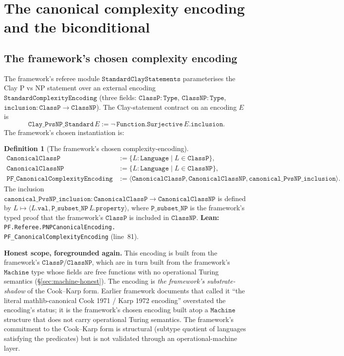 \documentclass[11pt,a4paper]{article}
\theoremstyle{plain}
\theoremstyle{definition}
\newtheorem{definition}[theorem]{Definition}
\begin{document}
\section{The canonical complexity encoding and the biconditional}
\label{sec:canonical-encoding}

\subsection{The framework's chosen complexity encoding}
\label{sec:chosen-encoding}

The framework's referee module $\mathtt{StandardClayStatements}$
parameterises the Clay P vs NP statement over an external encoding
$\mathtt{StandardComplexityEncoding}$ (three fields:
$\mathtt{ClassP : Type}$, $\mathtt{ClassNP : Type}$,
$\mathtt{inclusion : ClassP \to ClassNP}$). The Clay-statement
contract on an encoding $E$ is
\[
\mathtt{Clay\_PvsNP\_Standard}\, E := \neg\,
\mathtt{Function.Surjective}\, E.\mathtt{inclusion}.
\]
The framework's chosen instantiation is:

\begin{definition}[The framework's chosen complexity-encoding]
\label{def:pf-canonical-encoding}
\begin{align*}
\mathtt{CanonicalClassP} &:= \{ L : \mathtt{Language} \mid L \in
\mathtt{ClassP} \}, \\
\mathtt{CanonicalClassNP} &:= \{ L : \mathtt{Language} \mid L \in
\mathtt{ClassNP} \}, \\
\mathtt{PF\_CanonicalComplexityEncoding} &:= \langle
\mathtt{CanonicalClassP}, \mathtt{CanonicalClassNP},
\mathtt{canonical\_PvsNP\_inclusion} \rangle.
\end{align*}
The inclusion $\mathtt{canonical\_PvsNP\_inclusion} :
\mathtt{CanonicalClassP} \to \mathtt{CanonicalClassNP}$ is defined by
$L \mapsto \langle L.\mathtt{val}, \mathtt{P\_subset\_NP}\,
L.\mathtt{property}\rangle$, where
$\mathtt{P\_subset\_NP}$ is the framework's typed proof that the
framework's $\mathtt{ClassP}$ is included in
$\mathtt{ClassNP}$. \textbf{Lean:}
\texttt{PF.Referee.PNPCanonicalEncoding.\\
PF\_CanonicalComplexityEncoding} (line~81).
\end{definition}

\noindent\textbf{Honest scope, foregrounded again.} This encoding is
built from the framework's $\mathtt{ClassP}$/$\mathtt{ClassNP}$,
which are in turn built from the framework's $\mathtt{Machine}$ type
whose fields are free functions with no operational Turing semantics
(\S\ref{sec:machine-honest}). The encoding is \emph{the framework's
substrate-shadow} of the Cook--Karp form. Earlier framework documents
that called it ``the literal mathlib-canonical Cook 1971 / Karp 1972
encoding'' overstated the encoding's status; it is the framework's
chosen encoding built atop a $\mathtt{Machine}$ structure that does
not carry operational Turing semantics. The framework's commitment to
the Cook--Karp form is structural (subtype quotient of languages
satisfying the predicates) but is not validated through an
operational-machine layer.
\end{document}

